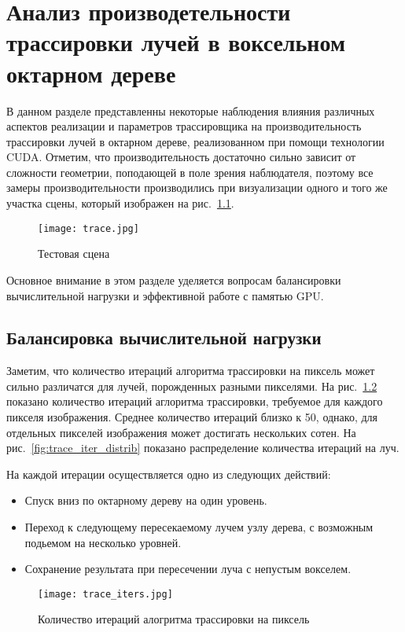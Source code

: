 \chapter{Анализ производетельности трассировки лучей в воксельном октарном дереве}

В данном разделе представленны некоторые наблюдения влияния различных аспектов реализации и параметров трассировщика на производительность трассировки лучей в октарном дереве, реализованном при помощи технологии CUDA. Отметим, что производительность достаточно сильно зависит от сложности геометрии, поподающей в поле зрения наблюдателя, поэтому все замеры производительности производились при визуализации одного и того же участка сцены, который изображен на рис.~\ref{fig:trace_scene}.

\begin{figure}[h]
\center
\texttt{[image: trace.jpg]}
\caption{Тестовая сцена}
\label{fig:trace_scene}
\end{figure}

Основное внимание в этом разделе уделяется вопросам балансировки вычислительной нагрузки и эффективной работе с памятью GPU.

\section{Балансировка вычислительной нагрузки}

Заметим, что количество итераций алгоритма трассировки на пиксель может сильно различатся для лучей, порожденных разными пикселями. На рис.~\ref{fig:trace_iters} показано количество итераций аглоритма трассировки, требуемое для каждого пикселя изображения. Среднее количество итераций близко к 50, однако, для отдельных пикселей изображения может достигать нескольких сотен. На рис.~\ref{fig:trace_iter_distrib} показано распределение количества итераций на луч.

На каждой итерации осуществляется одно из следующих действий:

\begin{itemize}
  \item Спуск вниз по октарному дереву на один уровень.
  \item Переход к следующему пересекаемому лучем узлу дерева, с возможным подьемом на несколько уровней.
  \item Сохранение результата при пересечении луча с непустым вокселем.
\end{itemize}

\begin{figure}[h]
\center
\texttt{[image: trace\_iters.jpg]}
\caption{Количество итераций алогритма трассировки на пиксель}
\label{fig:trace_iters}
\end{figure}

